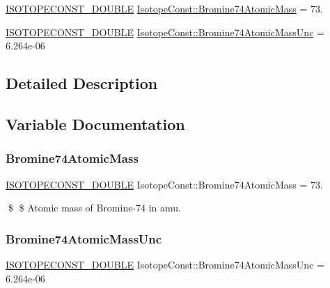 \begin{DoxyCompactItemize}
\item 
\mbox{\hyperlink{group___isotope_const-_macros_ga8f45a7272ce02c0b4c65c44636ed719a}{I\+S\+O\+T\+O\+P\+E\+C\+O\+N\+S\+T\+\_\+\+D\+O\+U\+B\+LE}} \mbox{\hyperlink{group___isotope_const-_bromine-_br74_ga63f3c953a2491ea610e02972a90017ab}{Isotope\+Const\+::\+Bromine74\+Atomic\+Mass}} = 73.
\item 
\mbox{\hyperlink{group___isotope_const-_macros_ga8f45a7272ce02c0b4c65c44636ed719a}{I\+S\+O\+T\+O\+P\+E\+C\+O\+N\+S\+T\+\_\+\+D\+O\+U\+B\+LE}} \mbox{\hyperlink{group___isotope_const-_bromine-_br74_ga2137e2e62d8009180ccc6df47e310617}{Isotope\+Const\+::\+Bromine74\+Atomic\+Mass\+Unc}} = 6.\+264e-\/06
\end{DoxyCompactItemize}


\subsection{Detailed Description}


\subsection{Variable Documentation}
\mbox{\label{group___isotope_const-_bromine-_br74_ga63f3c953a2491ea610e02972a90017ab}} 
\subsubsection{\texorpdfstring{Bromine74\+Atomic\+Mass}{Bromine74AtomicMass}}
{\footnotesize\ttfamily \mbox{\hyperlink{group___isotope_const-_macros_ga8f45a7272ce02c0b4c65c44636ed719a}{I\+S\+O\+T\+O\+P\+E\+C\+O\+N\+S\+T\+\_\+\+D\+O\+U\+B\+LE}} Isotope\+Const\+::\+Bromine74\+Atomic\+Mass = 73.}

\$ \$ Atomic mass of Bromine-\/74 in amu. \mbox{\label{group___isotope_const-_bromine-_br74_ga2137e2e62d8009180ccc6df47e310617}} 
\subsubsection{\texorpdfstring{Bromine74\+Atomic\+Mass\+Unc}{Bromine74AtomicMassUnc}}
{\footnotesize\ttfamily \mbox{\hyperlink{group___isotope_const-_macros_ga8f45a7272ce02c0b4c65c44636ed719a}{I\+S\+O\+T\+O\+P\+E\+C\+O\+N\+S\+T\+\_\+\+D\+O\+U\+B\+LE}} Isotope\+Const\+::\+Bromine74\+Atomic\+Mass\+Unc = 6.\+264e-\/06}

